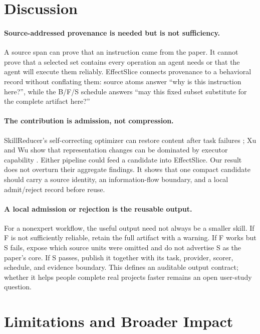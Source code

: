\documentclass[letterpaper]{article} %
\begin{document}
\section{Discussion}

\paragraph{Source-addressed provenance is needed but is not sufficiency.}
A source span can prove that an instruction came from the paper.  It cannot prove
that a selected set contains every operation an agent needs or that the agent will
execute them reliably.  EffectSlice connects provenance to a behavioral record
without conflating them: source atoms answer ``why is this instruction
here?'', while the B/F/S schedule answers ``may this fixed subset substitute for
the complete artifact here?''

\paragraph{The contribution is admission, not compression.}
SkillReducer's self-correcting optimizer can restore content after task failures
\cite{gao2026skillreducer}; Xu and Wu show that representation changes can be
dominated by executor capability \cite{xu2026compression}.  Either pipeline could
feed a candidate into EffectSlice.  Our result does not overturn their aggregate
findings.  It shows that one compact candidate should carry a source identity,
an information-flow boundary, and a local admit/reject record before reuse.

\paragraph{A local admission or rejection is the reusable output.}
For a nonexpert workflow, the useful output need not always be a smaller skill.
If F is not sufficiently reliable, retain the full artifact with a warning.  If F
works but S fails, expose which source units were omitted and do not advertise S
as the paper's core.  If S passes, publish it together with its task, provider,
scorer, schedule, and evidence boundary.  This defines an auditable output
contract; whether it helps people complete real projects faster remains an open
user-study question.

\section{Limitations and Broader Impact}
\end{document}
